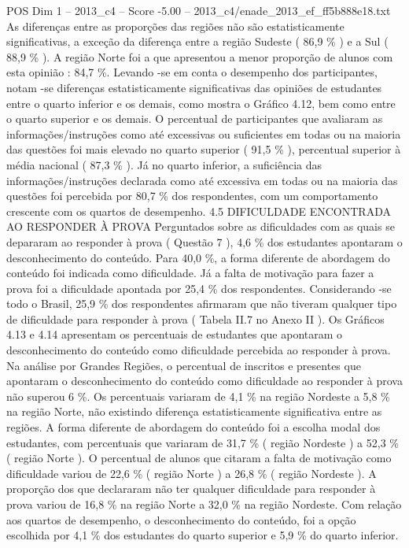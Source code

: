 \begin{textsample}{POS Dim 1 – 2013\_c4 – Score -5.00 – 2013\_c4/enade\_2013\_ef\_ff5b888e18.txt}
As diferenças entre as proporções das regiões não são estatisticamente significativas, a exceção da diferença entre a região Sudeste ( 86,9 \% ) e a Sul ( 88,9 \% ).
A região Norte foi a que apresentou a menor proporção de alunos com esta opinião : 84,7 \%.
Levando -se em conta o desempenho dos participantes, notam -se diferenças estatisticamente significativas das opiniões de estudantes entre o quarto inferior e os demais, como mostra o Gráfico 4.12, bem como entre o quarto superior e os demais.
O percentual de participantes que avaliaram as informações/instruções como até excessivas ou suficientes em todas ou na maioria das questões foi mais elevado no quarto superior ( 91,5 \% ), percentual superior à média nacional ( 87,3 \% ).
Já no quarto inferior, a suficiência das informações/instruções declarada como até excessiva em todas ou na maioria das questões foi percebida por 80,7 \% dos respondentes, com um comportamento crescente com os quartos de desempenho. 4.5 DIFICULDADE ENCONTRADA AO RESPONDER À PROVA Perguntados sobre as dificuldades com as quais se depararam ao responder à prova ( Questão 7 ), 4,6 \% dos estudantes apontaram o desconhecimento do conteúdo.
Para 40,0 \%, a forma diferente de abordagem do conteúdo foi indicada como dificuldade.
Já a falta de motivação para fazer a prova foi a dificuldade apontada por 25,4 \% dos respondentes.
Considerando -se todo o Brasil, 25,9 \% dos respondentes afirmaram que não tiveram qualquer tipo de dificuldade para responder à prova ( Tabela II.7 no Anexo II ).
Os Gráficos 4.13 e 4.14 apresentam os percentuais de estudantes que apontaram o desconhecimento do conteúdo como dificuldade percebida ao responder à prova.
Na análise por Grandes Regiões, o percentual de inscritos e presentes que apontaram o desconhecimento do conteúdo como dificuldade ao responder à prova não superou 6 \%.
Os percentuais variaram de 4,1 \% na região Nordeste a 5,8 \% na região Norte, não existindo diferença estatisticamente significativa entre as regiões.
A forma diferente de abordagem do conteúdo foi a escolha modal dos estudantes, com percentuais que variaram de 31,7 \% ( região Nordeste ) a 52,3 \% ( região Norte ).
O percentual de alunos que citaram a falta de motivação como dificuldade variou de 22,6 \% ( região Norte ) a 26,8 \% ( região Nordeste ).
A proporção dos que declararam não ter qualquer dificuldade para responder à prova variou de 16,8 \% na região Norte a 32,0 \% na região Nordeste.
Com relação aos quartos de desempenho, o desconhecimento do conteúdo, foi a opção escolhida por 4,1 \% dos estudantes do quarto superior e 5,9 \% do quarto inferior.

\end{textsample}
